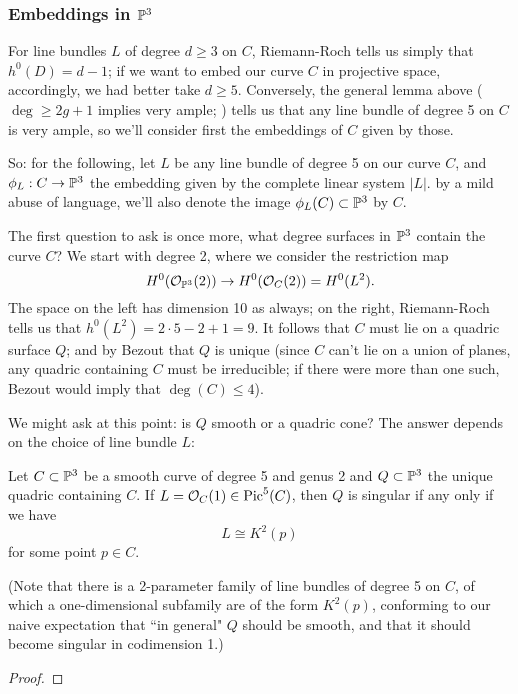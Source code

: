 \subsubsection{Embeddings in $\PP^3$}

For line bundles $L$ of degree $d \geq 3$ on $C$, Riemann-Roch tells us simply that $h^0(D) = d - 1$; if we want to embed our curve $C$ in projective space, accordingly, we had better take $d \geq 5$. Conversely, the general lemma above ($\deg \geq 2g+1$ implies very ample; \cite{**}) tells us that any line bundle of degree 5 on $C$ is very ample, so we'll consider first the embeddings of $C$ given by those.

So: for the following, let $L$ be any line bundle of degree 5 on our curve $C$, and $\phi_L : C \to \PP^3$ the embedding given by the complete linear system $|L|$. by a mild abuse of language, we'll also denote the image $\phi_L(C) \subset \PP^3$ by $C$.

The first question to ask is once more, what degree surfaces in $\PP^3$ contain the curve $C$? We start with degree 2, where we consider the restriction map
$$
H^0(\cO_{\PP^3}(2)) \to H^0(\cO_C(2)) = H^0(L^2).
$$
The space on the left has dimension 10 as always; on the right, Riemann-Roch tells us that $h^0(L^2) = 2\cdot5 - 2 + 1 = 9$. It follows that $C$ must lie on a quadric surface $Q$; and by Bezout that $Q$ is unique (since $C$ can't lie on a union of planes, any quadric containing $C$ must be irreducible; if there were more than one such, Bezout would imply that $\deg(C) \leq 4$).

We might ask at this point: is $Q$ smooth or a quadric cone? The answer depends on the choice of line bundle $L$:

\begin{proposition}
Let $C \subset \PP^3$ be a smooth curve of degree 5 and genus 2 and $Q \subset \PP^3$ the unique quadric containing $C$. If $L = \cO_C(1) \in \pic^5(C)$, then $Q$ is singular if any only if we have
$$
L \cong K^2(p)
$$
for some point $p \in C$.
\end{proposition}

(Note that there is a 2-parameter family of line bundles of degree 5 on $C$, of which a one-dimensional subfamily are of the form $K^2(p)$, conforming to our naive expectation that ``in general" $Q$ should be smooth, and that it should become singular in codimension 1.)

\begin{proof}

\end{proof}

